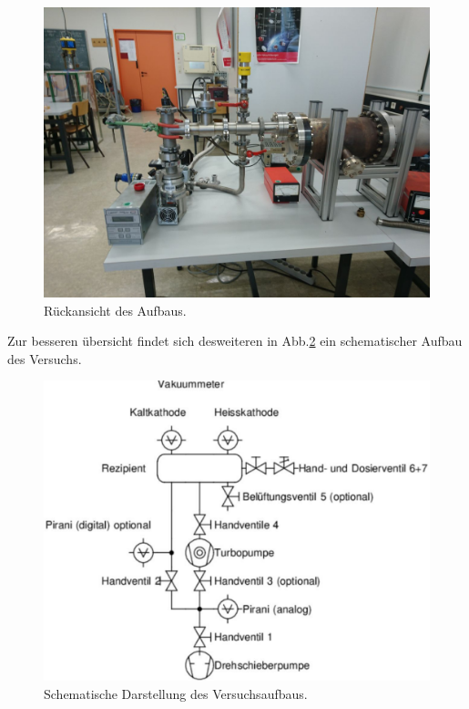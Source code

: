 \begin{figure}[H]
  \centering
  \includegraphics[scale=0.2]{Bilder/Versuch3.jpg}
  \caption{Rückansicht des Aufbaus.}
  \label{fotosaufbau1}
\end{figure}
Zur besseren übersicht findet sich desweiteren in Abb.\ref{aufbauschema} ein schematischer Aufbau des Versuchs.
\begin{figure}[H]
  \centering
  \includegraphics[scale=0.4]{Bilder/schemaVersuch.png}
  \caption{Schematische Darstellung des Versuchsaufbaus. \cite{online}}
  \label{aufbauschema}
\end{figure}
